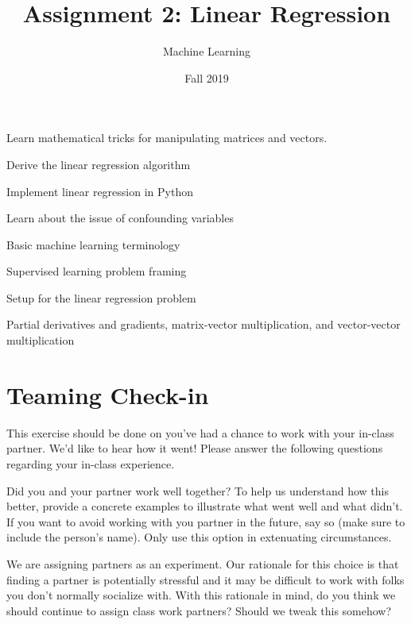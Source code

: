 \documentclass[assignment02_Solutions]{subfiles}
\title{Assignment 2: Linear Regression}
\author{Machine Learning}
\date{Fall 2019}
\begin{document}
\maketitle
\thispagestyle{firstpage}



\begin{learningobjectives}
\bi
\item Learn mathematical tricks for manipulating matrices and vectors.
\item Derive the linear regression algorithm
\item Implement linear regression in Python
\item Learn about the issue of confounding variables
\ei
\end{learningobjectives}

\begin{priorknowledge}
\bi
\item Basic machine learning terminology
\item Supervised learning problem framing
\item Setup for the linear regression problem
\item Partial derivatives and gradients, matrix-vector multiplication, and vector-vector multiplication
\ei
\end{priorknowledge}


\section*{Teaming Check-in}

\begin{exercise}
This exercise should be done on you've had a chance to work with your in-class partner.  We'd like to hear how it went!  Please answer the following questions regarding your in-class experience.

\bes
\item Did you and your partner work well together?  To help us understand how this better, provide a concrete examples to illustrate what went well and what didn't.  If you want to avoid working with you partner in the future, say so (make sure to include the person's name).  Only use this option in extenuating circumstances.
\item We are assigning partners as an experiment.  Our rationale for this choice is that finding a partner is potentially stressful and it may be difficult to work with folks you don't normally socialize with.  With this rationale in mind, do you think we should continue to assign class work partners?  Should we tweak this somehow?
\ees

\end{exercise}
\end{document}
